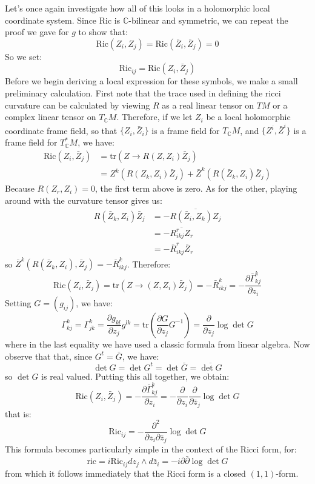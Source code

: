 \documentclass[11pt]{amsart}
\theoremstyle{definition}
\def \C{ \mathbb{C} }
\def \del{ \partial }
\def \delbar{ \bar{\partial} }
\def \Ric{ \text{Ric} }
\def \tr{ \text{tr} }
\def \ric{ \text{ric} }
\begin{document}
Let's once again investigate how all of this looks in a holomorphic local coordinate system.  Since $\Ric$ is $\C$-bilinear and symmetric, we can repeat the proof we gave for $g$ to show that:
%
$$ \Ric(Z_i, Z_j ) = \Ric( \bar{Z}_i, \bar{Z}_j )= 0 $$
%
So we set:
%
$$ \Ric_{ij} = \Ric( Z_i, \bar{Z}_j ) $$
%
Before we begin deriving a local expression for these symbols, we make a small preliminary calculation.  First note that the trace used in defining the ricci curvature can be calculated by viewing $R$ as a real linear tensor on $TM$ or a complex linear tensor on $T_{\C}M$.  Therefore, if we let $Z_i$ be a local holomorphic coordinate frame field, so that $\{ Z_i, \bar{Z}_i \}$ is a frame field for $T_{\C}M$, and $\{ Z^i, \bar{Z}^i \}$ is a frame field for $T^*_{\C}M$, we have:
%
\begin{align*}
\Ric( Z_i, \bar{Z}_j ) &= \tr( Z \rightarrow R( Z, Z_i ) \bar{Z}_j ) \\
&= Z^k( R(Z_k, Z_i) \bar{Z}_j ) + \bar{Z}^k ( R( \bar{Z}_k, Z_i ) \bar{Z}_j )
\end{align*}
%
Because $R(Z_r, Z_i) = 0$, the first term above is zero.  As for the other, playing around with the curvature tensor gives us:
%
\begin{align*}
R( \bar{Z}_k, Z_i ) \bar{Z}_j &= - \overline{ R( \bar{Z}_i, Z_k ) Z_j } \\
&= - \overline{ R_{ikj}^r Z_r } \\
&= - \bar{R}_{ikj}^r \bar{Z}_r
\end{align*}
%
so $\bar{Z}^k( R( \bar{Z}_k, Z_i ), \bar{Z}_j ) = - \bar{R}^k_{ikj}$.  Therefore:
%
$$ \Ric( Z_i, \bar{Z}_j ) = \tr( Z \rightarrow( Z, Z_i ) \bar{Z}_j ) = - \bar{R}_{ikj}^k = - \frac{ \del \bar{ \Gamma }_{kj}^k }{ \del z_i } $$
%
Setting $G = (g_{ij})$, we have:
%
$$ \Gamma_{kj}^k = \Gamma_{jk}^k = \frac{ \del g_{kl} }{ \del z_j } g^{lk} = \tr \left( \frac{ \del G }{ \del z_j } G^{-1} \right) = \frac{ \del }{ \del z_j } \log \det G $$
%
where in the last equality we have used a classic formula from linear algebra.  Now observe that that, since $G^t = \bar{G}$, we have:
%
$$ \det G = \det G^t = \det \bar{G} = \overline { \det G } $$
%
so $\det G$ is real valued.  Putting this all together, we obtain:
%
$$ \Ric( Z_i, \bar{Z}_j ) = - \frac{ \del \bar{ \Gamma }_{kj}^k }{ \del z_i } = - \frac{ \del }{ \del z_i } \frac{ \del }{ \del \bar{z}_j } \log \det G $$
%
that is:
%
$$ \Ric_{ij} = - \frac{ \del^2 }{ \del z_i \del \bar{z}_j } \log \det G $$
%
This formula becomes particularly simple in the context of the Ricci form, for:
%
$$ \ric = i \Ric_{ij} d z_j \wedge d \bar{z}_i = - i \del \delbar \log \det G $$
%
from which it follows immediately that the Ricci form is a closed $(1,1)$-form.
\end{document}

